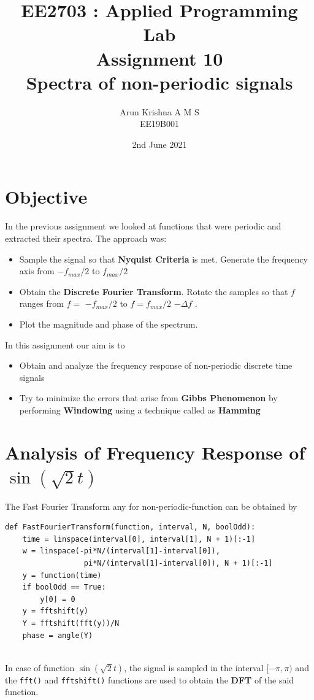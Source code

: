 \documentclass[12pt, a4paper]{report}
\title{\textbf{EE2703 : Applied Programming Lab \\ Assignment 10 \\ Spectra of non-periodic signals }} %
\author{Arun Krishna A M S \\ EE19B001} %
\date{2nd June 2021} %
\begin{document}
		
		
\maketitle %
\justifying

\section*{Objective}
In the previous assignment we looked at functions that were periodic and extracted their
spectra. The approach was:
\begin{itemize}
  	\item Sample the signal so that \textbf{Nyquist Criteria} is met. Generate the frequency axis from $-f_{max}/2$ to $f_{max}/2$
    \item Obtain the \textbf{Discrete Fourier Transform}. Rotate the samples so that $f$ ranges from $f = $ $- f_{max}/2$ to $f =f_{max}/2 $ $-\Delta f$ . 
  	\item Plot the magnitude and phase of the spectrum.
\end{itemize}
In this assignment our aim is to
\begin{itemize}
  	\item Obtain and analyze the frequency response of non-periodic discrete time signals
    \item Try to minimize the errors that arise from \textbf{Gibbs Phenomenon}  by performing \textbf{Windowing} using a technique called as \textbf{Hamming} 
\end{itemize}

\section*{Analysis of Frequency Response of $\sin (\sqrt{2}t)$}
The Fast Fourier Transform any for non-periodic-function can be obtained by
\begin{verbatim}
def FastFourierTransform(function, interval, N, boolOdd):
    time = linspace(interval[0], interval[1], N + 1)[:-1]
    w = linspace(-pi*N/(interval[1]-interval[0]), 
                  pi*N/(interval[1]-interval[0]), N + 1)[:-1]
    y = function(time)
    if boolOdd == True:
        y[0] = 0
    y = fftshift(y) 
    Y = fftshift(fft(y))/N
    phase = angle(Y)
\end{verbatim}
\\

In case of function $\sin (\sqrt{2}t)$, the signal is sampled in the interval $[−\pi, \pi)$ and the \texttt{fft()} and \texttt{fftshift()} functions are used to obtain the \textbf{DFT} of the said function. 
\end{document}
